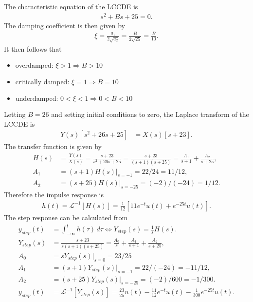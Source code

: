 \documentclass{report}
\begin{document}
\begin{solution}
    The characteristic equation of the LCCDE is 
    \begin{align*}
        s^2 + Bs + 25 = 0.
    \end{align*}
    The damping coefficient is then given by 
    \begin{align*}
        \xi = \frac{a_1}{2\sqrt{a_2}} = \frac{B}{2\sqrt{25}} = \frac{B}{10}.
    \end{align*}
    It then follows that
    \begin{itemize}
        \item overdamped: $\xi > 1 \Longrightarrow B > 10$
        \item critically damped: $\xi = 1 \Longrightarrow B = 10$
        \item underdamped: $0<\xi<1 \Longrightarrow 0<B<10$
    \end{itemize}
    Letting $B=26$ and setting initial conditions to zero, the Laplace transform of the LCCDE is
    \begin{align*}
        Y(s)[s^2+26s+25] &= X(s)[s+23].
    \end{align*}
    The transfer function is given by
    \begin{align*}
        H(s) &= \frac{Y(s)}{X(s)} = \frac{s+23}{s^2+26s+25} = \frac{s+23}{(s+1)(s+25)} = \frac{A_1}{s+1} + \frac{A_2}{s+25}, \\
        A_1 &= (s+1)H(s)\big|_{s=-1} = 22/24 = 11/12, \\
        A_2 &= (s+25)H(s)\big|_{s=-25} = (-2)/(-24) = 1/12.
    \end{align*}
    Therefore the impulse response is 
    \begin{align*}
        h(t) = \mathcal{L}^{-1}[H(s)] = \frac{1}{12}\left[11e^{-t}u(t) + e^{-25t}u(t)\right].
    \end{align*}
    The step response can be calculated from 
    \begin{align*}
        y_{step}(t) &= \int_{-\infty}^{t} h(\tau) \,d\tau \iff Y_{step}(s) = \frac{1}{s}H(s). \\[0.5cm]
        Y_{step}(s) &= \frac{s+23}{s(s+1)(s+25)} = \frac{A_0}{s} + \frac{A_1}{s+1} + \frac{A_2}{s+25}, \\
        A_0 &= sY_{step}(s)\big|_{s=0} = 23/25 \\
        A_1 &= (s+1)Y_{step}(s)\big|_{s=-1} = 22/(-24) = -11/12, \\
        A_2 &= (s+25)Y_{step}(s)\big|_{s=-25} = (-2)/600 = -1/300. \\[0.5cm]
        y_{step}(t) &= \mathcal{L}^{-1}[Y_{step}(s)] = \frac{23}{25}u(t) - \frac{11}{12}e^{-t}u(t) - \frac{1}{300}e^{-25t}u(t).
    \end{align*}
\end{solution}
\end{document}
